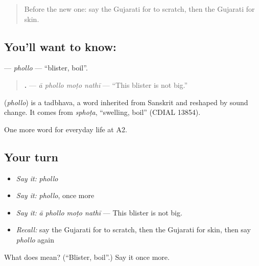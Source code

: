 \begin{quote}
Before the new one: say the Gujarati for to scratch, then the Gujarati for skin.
\end{quote}

\subsection*{You'll want to know: }
\textbf{} — \emph{phollo} — \textquotedblleft{}blister, boil\textquotedblright{}.

\begin{quote}
\textbf{   .} — \emph{ā phollo moṭo nathī} — \textquotedblleft{}This blister is not big.\textquotedblright{}
\end{quote}

\begin{cousinweb}
\textbf{} (\emph{phollo}) is a tadbhava, a word inherited from Sanskrit and reshaped by sound change. It comes from \emph{sphoṭa}, \textquotedblleft{}swelling, boil\textquotedblright{} (CDIAL 13854).
\end{cousinweb}

\begin{grammarlens}[title={What you've built}]
One more word for everyday life at A2.
\end{grammarlens}

\subsection*{Your turn}
\begin{itemize}
\raggedright
  \item \emph{Say it:} \emph{phollo}
  \item \emph{Say it:} \emph{phollo}, once more
  \item \emph{Say it:} \emph{ā phollo moṭo nathī} — This blister is not big.
  \item \emph{Recall:} say the Gujarati for to scratch, then the Gujarati for skin, then say \emph{phollo} again
\end{itemize}

\begin{tcolorbox}[breakable,colback=teal!4,colframe=teal!35!black,title={Before you move on}]
What does  mean? (\textquotedblleft{}Blister, boil\textquotedblright{}.) Say it once more.
\end{tcolorbox}
